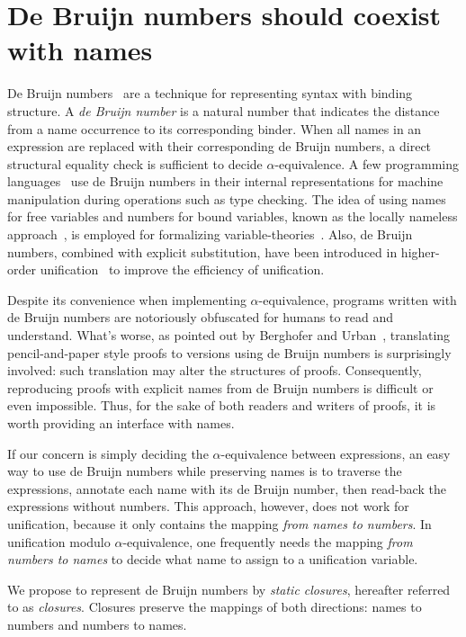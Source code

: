 \documentclass[a4paper,UKenglish]{lipics-v2016}
\begin{document}
  \section{De Bruijn numbers should coexist with names}
\label{closures}
De Bruijn numbers~\cite{de_bruijn_lambda_1972} are a technique for
representing syntax with binding structure.
A \emph{de Bruijn number} is a natural number that indicates
the distance from a name occurrence to its corresponding binder.
When all names in an expression are replaced with their corresponding de Bruijn numbers,
a direct structural equality check is sufficient to decide $\alpha$-equivalence.
A few programming languages~\cite{norell_towards_2007} use de Bruijn numbers
in their internal representations for machine manipulation during operations such as type checking.
The idea of using names for free variables and numbers for bound variables,
known as the locally nameless approach~\cite{chargueraud_locally_2012},
is employed for formalizing variable-theories~\cite{aydemir_nominal_2006, aydemir_engineering_2008}.
Also, de Bruijn numbers, combined with explicit substitution, have been introduced in
higher-order unification~\cite{dowek_higher_2000} to improve the efficiency of unification.

Despite its convenience when implementing $\alpha$-equivalence,
programs written with de Bruijn numbers are notoriously obfuscated for humans to read and understand.
What's worse, as pointed out by Berghofer and Urban~\cite{berghofer_head--head_2007},
translating pencil-and-paper style proofs to versions using de Bruijn numbers is surprisingly involved:
such translation may alter the structures of proofs.
Consequently, reproducing proofs with explicit names from de Bruijn numbers is difficult or even impossible.
Thus, for the sake of both readers and writers of proofs, it is worth providing an interface with names.

If our concern is simply deciding the $\alpha$-equivalence between expressions,
an easy way to use de Bruijn numbers while preserving names is
to traverse the expressions, annotate each name with its de Bruijn number,
then read-back the expressions without numbers.
This approach, however, does not work for unification,
because it only contains the mapping \emph{from names to numbers}.
In unification modulo $\alpha$-equivalence, one frequently needs
the mapping \emph{from numbers to names} to decide
what name to assign to a unification variable.


We propose to represent de Bruijn numbers by \emph{static closures},
hereafter referred to as \emph{closures}.
Closures preserve the mappings of both directions: names to numbers and numbers to names.
\end{document}
